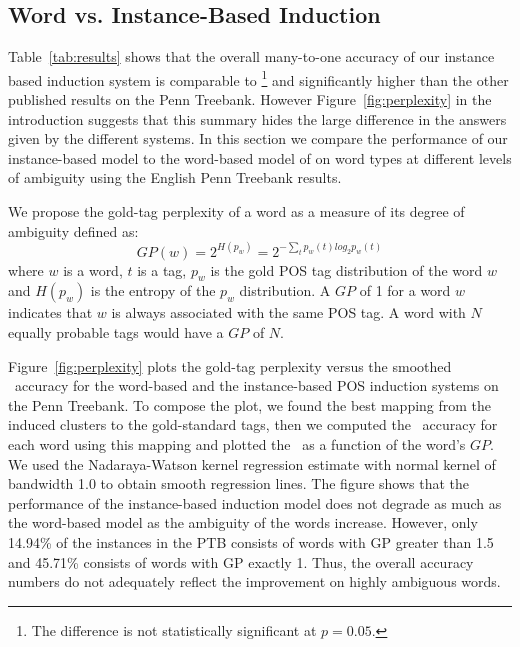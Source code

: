 \subsection{Word vs. Instance-Based Induction}
\label{sec:typevsinstance}

Table~\ref{tab:results} shows that the overall many-to-one accuracy of
our instance based induction system is comparable to
\cite{yatbaz-sert-yuret:2012:EMNLP-CoNLL}\footnote{The difference is
  not statistically significant at $p=0.05$.} and significantly higher
than the other published results on the Penn Treebank.  However
Figure~\ref{fig:perplexity} in the introduction suggests that this
summary hides the large difference in the answers given by the
different systems.  In this section we compare the performance of our
instance-based model to the word-based model of
\cite{yatbaz-sert-yuret:2012:EMNLP-CoNLL} on word types at different
levels of ambiguity using the English Penn Treebank results.

We propose the gold-tag perplexity of a word as a measure of its
degree of ambiguity defined as:
\begin{equation*} \label{eq:tag-perp}
GP(w) = 2^{H(p_w)} = 2^{-\sum_{t} p_w(t)log_2 p_w(t)}
\end{equation*}
\noindent where $w$ is a word, $t$ is a tag, $p_w$ is the gold POS tag
distribution of the word $w$ and $H(p_w)$ is the entropy of the $p_w$
distribution.  A $GP$ of 1 for a word $w$ indicates that $w$ is always
associated with the same POS tag.  A word with $N$ equally probable
tags would have a $GP$ of $N$.

Figure~\ref{fig:perplexity} plots the gold-tag perplexity versus the
smoothed \mto\ accuracy for the word-based and the instance-based POS
induction systems on the Penn Treebank.  To compose the plot, we found
the best mapping from the induced clusters to the gold-standard tags,
then we computed the \mto\ accuracy for each word using this mapping
and plotted the \mto\ as a function of the word's $GP$.  We used the
Nadaraya-Watson kernel regression estimate
\cite{nadaraya1964estimating,watson1964smooth} with normal kernel of
bandwidth 1.0 to obtain smooth regression lines.  The figure shows
that the performance of the instance-based induction model does not
degrade as much as the word-based model as the ambiguity of the words
increase.  However, only 14.94\% of the instances in the PTB consists
of words with GP greater than 1.5 and 45.71\% consists of words with
GP exactly 1.  Thus, the overall accuracy numbers do not adequately
reflect the improvement on highly ambiguous words.

